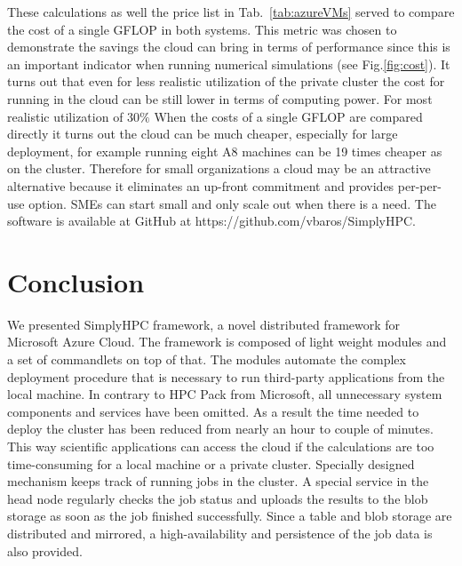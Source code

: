 \documentclass[3p,times]{elsarticle}
\begin{document}
These calculations as well the price list in Tab.~\ref{tab:azureVMs} served to compare the cost of a single GFLOP in both systems. This metric was chosen to demonstrate the savings the cloud can bring in terms of performance since this is an important indicator when running numerical simulations (see Fig.\ref{fig:cost}). It turns out that even for less realistic utilization of the private cluster the cost for running in the cloud can be still lower in terms of computing power. For most realistic utilization of $30\%$ When the costs of a single GFLOP are compared directly it turns out the cloud can be much cheaper, especially for large deployment, for example running eight A8 machines can be 19 times cheaper as on the cluster. Therefore for small organizations a cloud may be an attractive alternative because it eliminates an up-front commitment and provides per-per-use option. SMEs can start small and only scale out when there is a need. The software is available at GitHub at https://github.com/vbaros/SimplyHPC.
 



\section{Conclusion}
\label{sec:conclusions}

We presented SimplyHPC framework, a novel distributed framework for Microsoft Azure Cloud. The framework is composed of light weight modules and a set of commandlets on top of that. The modules automate the complex deployment procedure that is necessary to run third-party applications from the local machine. In contrary to HPC Pack from Microsoft, all unnecessary system components and services have been omitted. As a result the time needed to deploy the cluster has been reduced from nearly an hour to couple of minutes.  This way scientific applications can access the cloud if the calculations are too time-consuming for a local machine or a private cluster. Specially designed mechanism keeps track of running jobs in the cluster. A special service in the head node regularly checks the job status and uploads the results to the blob storage as soon as the job finished successfully. Since a table and blob storage are distributed and mirrored, a high-availability and persistence of the job data is also provided.
\end{document}
